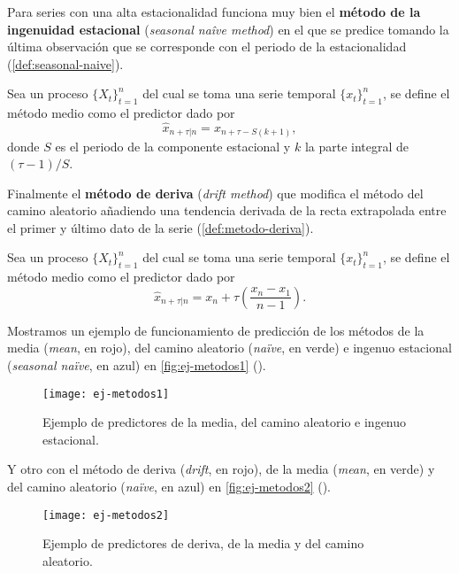Para series con una alta estacionalidad funciona muy bien el \textbf{método de la ingenuidad estacional} (\emph{seasonal naîve method}) en el que se predice tomando la última observación que se corresponde con el periodo de la estacionalidad (\autoref{def:seasonal-naive}).

\begin{definicion}
  Sea un proceso $\{X_t\}_{t = 1}^n$ del cual se toma una serie temporal $\{x_t\}_{t = 1}^n$, se define el método medio como el predictor dado por
  $$\hat{x}_{n + \tau | n} = x_{n + \tau - S(k + 1)},$$
  donde $S$ es el periodo de la componente estacional y $k$ la parte integral de $(\tau - 1)/S$.
  \label{def:seasonal-naive}
\end{definicion}

Finalmente el \textbf{método de deriva} (\emph{drift method}) que modifica el método del camino aleatorio añadiendo una tendencia derivada de la recta extrapolada entre el primer y último dato de la serie (\autoref{def:metodo-deriva}).

\begin{definicion}
  Sea un proceso $\{X_t\}_{t = 1}^n$ del cual se toma una serie temporal $\{x_t\}_{t = 1}^n$, se define el método medio como el predictor dado por
  $$\hat{x}_{n + \tau | n} = x_n + \tau \left(\dfrac{x_n - x_1}{n - 1}\right).$$
  \label{def:metodo-deriva}
\end{definicion}

Mostramos un ejemplo de funcionamiento de predicción de los métodos de la media (\emph{mean}, en rojo), del camino aleatorio (\emph{naïve}, en verde) e ingenuo estacional (\emph{seasonal naïve}, en azul) en \autoref{fig:ej-metodos1} (\cite{hyndman2018forecasting}).

\begin{figure}[htpb]
  \centering
  \texttt{[image: ej-metodos1]}
  \caption{Ejemplo de predictores de la media, del camino aleatorio e ingenuo estacional.}
  \label{fig:ej-metodos1}
\end{figure}

Y otro con el método de deriva (\emph{drift}, en rojo), de la media (\emph{mean}, en verde) y del camino aleatorio (\emph{naïve}, en azul) en \autoref{fig:ej-metodos2} (\cite{hyndman2018forecasting}).

\begin{figure}[htpb]
  \centering
  \texttt{[image: ej-metodos2]}
  \caption{Ejemplo de predictores de deriva, de la media y del camino aleatorio.}
  \label{fig:ej-metodos2}
\end{figure}

